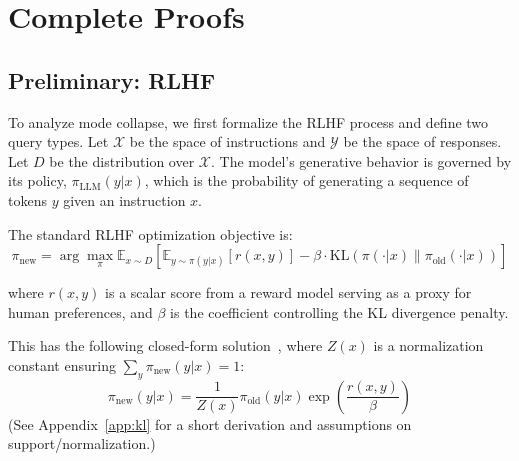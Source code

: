 \section{Complete Proofs}\label{app:proof}

\subsection{Preliminary: RLHF} \label{sec:formal_framework}

To analyze mode collapse, we first formalize the RLHF process and define two query types. Let $\mathcal{X}$ be the space of instructions and $\mathcal{Y}$ be the space of responses. Let $D$ be the distribution over $\mathcal{X}$. The model's generative behavior is governed by its policy, $\pi_{\text{LLM}}(y|x)$, which is the probability of generating a sequence of tokens $y$ given an instruction $x$.

\begin{definition}[RLHF]
The standard RLHF optimization objective is:
\begin{equation}
\pi_{\text{new}} = \arg\max_{\pi} \mathbb{E}_{x \sim D}\left[\mathbb{E}_{y \sim \pi(y|x)}[r(x,y)] - \beta \cdot \text{KL}(\pi(\cdot|x) \| \pi_{\text{old}}(\cdot|x))\right]
\label{eq:rlhf_objective}
\end{equation}
\end{definition}

where $r(x,y)$ is a scalar score from a reward model serving as a proxy for human preferences, and $\beta$ is the coefficient controlling the KL divergence penalty.

%
This has the following closed-form solution~\citep{rafailov2024directpreferenceoptimizationlanguage}, where $Z(x)$ is a normalization constant ensuring $\sum_{y}\pi_{\text{new}}(y|x)=1$:
\begin{equation}\label{eq:rlhf_close_form}
\pi_{\text{new}}(y|x) = \frac{1}{Z(x)}\pi_{\text{old}}(y|x) \exp\left(\frac{r(x,y)}{\beta}\right)
\end{equation}
(See Appendix~\ref{app:kl} for a short derivation and assumptions on support/normalization.)

